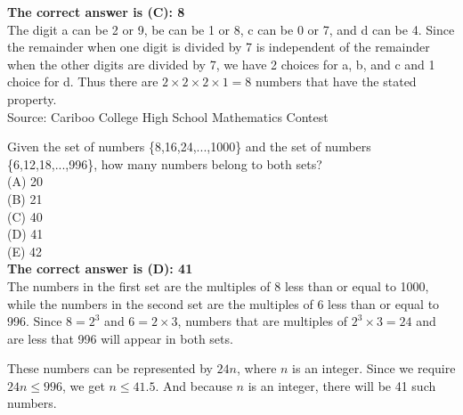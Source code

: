 \documentclass{article}
\begin{document}

\textbf{The correct answer is (C): 8}\\[1 ex]
The digit a can be 2 or 9, be can be 1 or 8, c can be 0 or 7, and d can be 4. Since the remainder when one digit is divided by 7 is independent of the remainder when the other digits are divided by 7, we have 2 choices for a, b, and c and 1 choice for d. Thus there are $2\times2\times2\times1=8$ numbers that have the stated property.
\\[5 ex]

\scriptsize
Source: Cariboo College High School Mathematics Contest

\normalsize
Given the set of numbers \{8,16,24,...,1000\} and the set of numbers \{6,12,18,...,996\}, how many numbers belong to both sets?\\
(A) 20\\
(B) 21\\
(C) 40\\
(D) 41\\
(E) 42\\


\textbf{The correct answer is (D): 41}\\[1 ex]
The numbers in the first set are the multiples of 8 less than or equal to 1000, while the numbers in the second set are the multiples of 6 less than or equal to 996. Since $8=2^3$ and $6=2\times3$, numbers that are multiples of $2^{3}\times3=24$ and are less that 996 will appear in both sets.

These numbers can be represented by $24n$, where $n$ is an integer. Since we require $24n\leq996$, we get $n\leq41.5$. And because $n$ is an integer, there will be 41 such numbers.
\\[5 ex]
\end{document}
